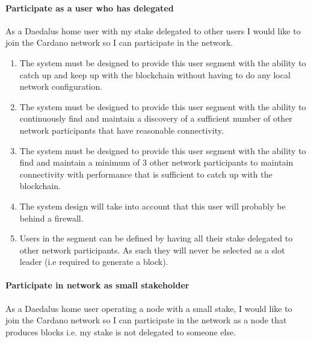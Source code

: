 \documentclass[11pt,a4paper]{article}
\begin{document}
\paragraph{Participate as a user who has delegated}

As a Daedalus home user with my stake delegated to other users I would
like to join the Cardano network so I can participate in the network.

\begin{enumerate}
\item
  The system must be designed to provide this user segment with the
  ability to catch up and keep up with the blockchain without having to
  do any local network configuration.
\item
  The system must be designed to provide this user segment with the
  ability to continuously find and maintain a discovery of a sufficient
  number of other network participants that have reasonable
  connectivity.
\item
  The system must be designed to provide this user segment with the
  ability to find and maintain a minimum of 3 other network participants
  to maintain connectivity with performance that is sufficient to catch
  up with the blockchain.
\item
  The system design will take into account that this user will probably
  be behind a firewall.
\item
  Users in the segment can be defined by having all their stake
  delegated to other network participants. As such they will never be
  selected as a slot leader (i.e required to generate a block).
\end{enumerate}

\paragraph{Participate in network as small stakeholder}

As a Daedalus home user operating a node with a small stake, I would
like to join the Cardano network so I can participate in the network as
a node that produces blocks i.e. my stake is not delegated to someone
else.
\end{document}
